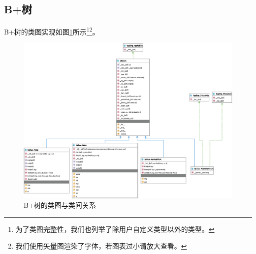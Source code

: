 \documentclass[UTF8]{ctexrep} %
\begin{document}
\subsection{B+树}
B+树的类图实现如图\ref{fig:bplus_diagram}所示\footnote{为了类图完整性，我们也列举了除用户自定义类型以外的类型。}\footnote{我们使用矢量图渲染了字体，若图表过小请放大查看。}。
\begin{figure}[H]
    \centering
    \includegraphics[width=\linewidth]{figure/bplus.eps}
    \caption{B+树的类图与类间关系}
    \label{fig:bplus_diagram}
\end{figure}
\end{document}
